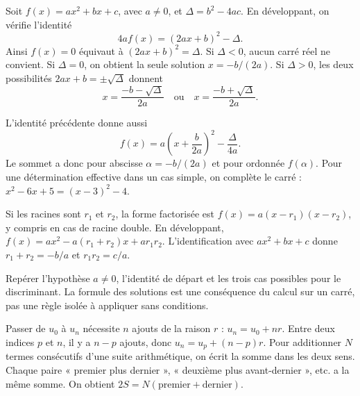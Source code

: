 \clearpage
\gdef\otChapNum{0}
\pagestyle{otFront}
\label{demonstrations-debut}
\label{dem-second-degre}
\begin{demonstration}
Soit $f(x)=ax^2+bx+c$, avec $a\neq0$, et $\Delta=b^2-4ac$.
En développant, on vérifie l'identité
\[4af(x)=(2ax+b)^2-\Delta.\]
Ainsi $f(x)=0$ équivaut à $(2ax+b)^2=\Delta$.
Si $\Delta<0$, aucun carré réel ne convient. Si $\Delta=0$, on obtient
la seule solution $x=-b/(2a)$. Si $\Delta>0$, les deux possibilités
$2ax+b=\pm\sqrt\Delta$ donnent
\[x=\frac{-b-\sqrt\Delta}{2a}\quad\text{ou}\quad x=\frac{-b+\sqrt\Delta}{2a}.\]
\end{demonstration}
\begin{propriete}
L'identité précédente donne aussi
\[f(x)=a\left(x+\frac b{2a}\right)^2-\frac\Delta{4a}.
\]
Le sommet a donc pour abscisse $\alpha=-b/(2a)$ et pour ordonnée $f(\alpha)$.
Pour une détermination effective dans un cas simple, on complète le carré :
$x^2-6x+5=(x-3)^2-4$.
\end{propriete}
\begin{demonstration}
Si les racines sont $r_1$ et $r_2$, la forme factorisée est
$f(x)=a(x-r_1)(x-r_2)$, y compris en cas de racine double.
En développant, $f(x)=ax^2-a(r_1+r_2)x+ar_1r_2$.
L'identification avec $ax^2+bx+c$ donne
$r_1+r_2=-b/a$ et $r_1r_2=c/a$.
\end{demonstration}
\begin{savoirfaire}
Repérer l'hypothèse $a\neq0$, l'identité de départ et les trois cas possibles
pour le discriminant. La formule des solutions est une conséquence du calcul
sur un carré, pas une règle isolée à appliquer sans conditions.
\end{savoirfaire}
\clearpage
{}
\label{dem-suites}
\begin{demonstration}
Passer de $u_0$ à $u_n$ nécessite $n$ ajouts de la raison $r$ :
$u_n=u_0+nr$. Entre deux indices $p$ et $n$, il y a $n-p$ ajouts,
donc $u_n=u_p+(n-p)r$.
Pour additionner $N$ termes consécutifs d'une suite arithmétique, on écrit
la somme dans les deux sens. Chaque paire « premier plus dernier »,
« deuxième plus avant-dernier », etc. a la même somme.
On obtient $2S=N(\text{premier}+\text{dernier})$.
\end{demonstration}

